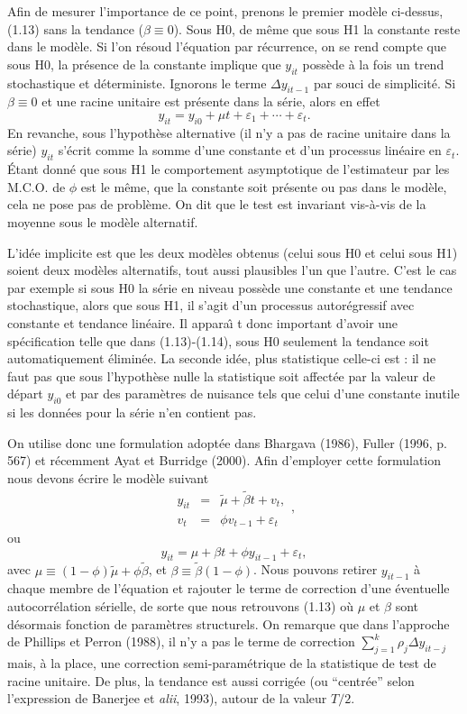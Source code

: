 \documentclass{article}
\begin{document}
Afin de mesurer l'importance de ce point, prenons le premier
mod\`ele ci-dessus, (1.13) sans la tendance ($\beta\equiv 0$). Sous
H0, de m\^eme que sous H1 la constante reste dans le mod\`ele. Si
l'on r\'esoud l'\'equation par r\'ecurrence, on se rend compte que
sous H0, la pr\'esence de la constante implique que $y_{it}$
poss\`ede \`a la fois un trend stochastique et d\'eterministe.
Ignorons le terme $\Delta y_{it-1}$ par souci de simplicit\'e. Si
$\beta\equiv 0$ et une racine unitaire est pr\'esente dans la
s\'erie, alors en effet $$y_{it}=y_{i0}+\mu
t+\varepsilon_1+\cdots+\varepsilon_t.$$ En revanche, sous
l'hypoth\`ese alternative (il n'y a pas de racine unitaire dans la
s\'erie) $y_{it}$ s'\'ecrit comme la somme d'une constante et d'un
processus lin\'eaire en $\varepsilon_t$. \'Etant donn\'e que sous H1
le comportement asymptotique de l'estimateur par les M.C.O. de
$\phi$ est le m\^eme, que la constante soit pr\'esente ou pas dans
le mod\`ele, cela ne pose pas de probl\`eme. On dit que le test est
invariant vis-\`a-vis de la moyenne sous le mod\`ele alternatif.

L'id\'ee implicite est que les deux mod\`eles obtenus (celui sous H0
et celui sous H1) soient deux mod\`eles alternatifs, tout aussi
plausibles l'un que l'autre. C'est le cas par exemple si sous H0 la
s\'erie en niveau poss\`ede une constante et une tendance
stochastique, alors que sous H1, il s'agit d'un processus
autor\'egressif avec constante et tendance lin\'eaire. Il appara\^\i
t donc important d'avoir une sp\'ecification telle que dans
(1.13)-(1.14), sous H0 seulement la tendance soit automatiquement
\'elimin\'ee. La seconde id\'ee, plus statistique celle-ci est : il
ne faut pas que sous l'hypoth\`ese nulle la statistique soit
affect\'ee par la valeur de d\'epart $y_{i0}$ et par des
param\`etres de nuisance tels que celui d'une constante inutile si
les donn\'ees pour la s\'erie n'en contient pas.

On utilise donc une formulation adopt\'ee dans Bhargava (1986),
Fuller (1996, p. 567) et r\'ecemment Ayat et Burridge (2000). Afin
d'employer cette formulation nous devons \'ecrire le mod\`ele
suivant $$\begin{array}{cll} y_{it} & = &
\tilde{\mu}+\tilde{\beta}t+v_t,\\ v_t & = & \phi
v_{t-1}+\varepsilon_t\end{array},$$ ou $$y_{it}=\mu+\beta t+\phi
y_{it-1}+\varepsilon_t,$$ avec
$\mu\equiv(1-\phi)\tilde{\mu}+\phi\tilde{\beta}$, et
$\beta\equiv\tilde{\beta}(1-\phi)$. Nous pouvons retirer $y_{it-1}$
\`a chaque membre de l'\'equation et rajouter le terme de correction
d'une \'eventuelle autocorr\'elation s\'erielle, de sorte que nous
retrouvons (1.13) o\`u $\mu$ et $\beta$ sont d\'esormais fonction de
param\`etres structurels. On remarque que dans l'approche de
Phillips et Perron (1988), il n'y a pas le terme de correction
$\sum_{j=1}^k\rho_j\Delta y_{it-j}$ mais, \`a la place, une
correction semi-param\'etrique de la statistique de test de racine
unitaire. De plus, la tendance est aussi corrig\'ee (ou
``centr\'ee'' selon l'expression de Banerjee et \textit{alii},
1993), autour de la valeur $T/2$.
\end{document}
